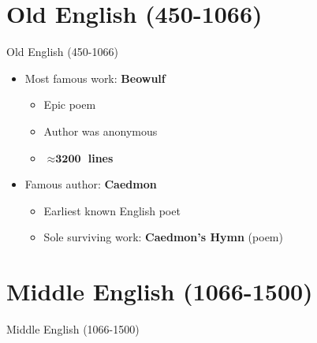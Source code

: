 \documentclass[
  12pt,
    progressbar=frametitle]{beamer}
\providecommand{\tightlist}{%
  \setlength{\itemsep}{0pt}\setlength{\parskip}{0pt}}
\begin{document}
\section{Old English (450-1066)}
\begin{frame}[allowframebreaks]
{Old English (450-1066)}
\begin{itemize}
\tightlist
\item
  Most famous work: \textbf{Beowulf}

  \begin{itemize}
  \tightlist
  \item
    Epic poem
  \item
    Author was anonymous
  \item
    \textbf{\(\boldsymbol\approx \textbf{3200}\) lines}
  \end{itemize}
\item
  Famous author: \textbf{Caedmon}

  \begin{itemize}
  \tightlist
  \item
    Earliest known English poet
  \item
    Sole surviving work: \textbf{Caedmon's Hymn} (poem)
  \end{itemize}
\end{itemize}
\end{frame}

\section{Middle English (1066-1500)}
\begin{frame}[allowframebreaks]
{Middle English (1066-1500)}
\end{frame}
\end{document}
